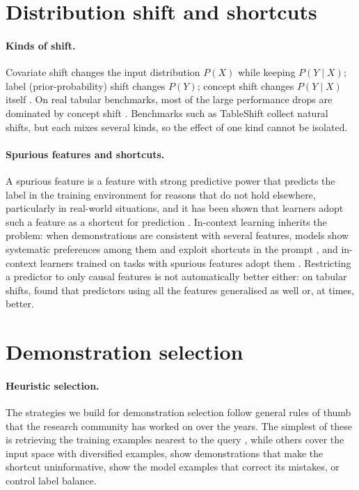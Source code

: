 \section{Distribution shift and shortcuts}
\label{sec:bg-shift}

\paragraph{Kinds of shift.}
Covariate shift changes the input distribution $P(X)$ while keeping $P(Y \mid X)$; label (prior-probability) shift changes $P(Y)$; concept shift changes $P(Y \mid X)$ itself \citep{shimodaira2000improving,quinonero2009dataset,morenotorres2012unifying}.
On real tabular benchmarks, most of the large performance drops are dominated by concept shift \citep{liu2023need}.
Benchmarks such as TableShift \citep{gardner2023tableshift} collect natural shifts, but each mixes several kinds, so the effect of one kind cannot be isolated.

\paragraph{Spurious features and shortcuts.}
A spurious feature is a feature with strong predictive power that predicts the label in the training environment for reasons that do not hold elsewhere, particularly in real-world situations, and it has been shown that learners adopt such a feature as a shortcut for prediction \citep{geirhos2020shortcut, nagarajan2021understanding}. In-context learning inherits the problem: when demonstrations are consistent with several features, models show systematic preferences among them \citep{si2023measuring} and exploit shortcuts in the prompt \citep{tang2023large}, and in-context learners trained on tasks with spurious features adopt them \citep{harutyunyan2026incontext,chen2026incontext}. Restricting a predictor to only causal features is not automatically better either: on tabular shifts, \citet{nastl2024causal} found that predictors using all the features generalised as well or, at times, better.

\section{Demonstration selection}
\label{sec:bg-selection}
\paragraph{Heuristic selection.}
The strategies we build for demonstration selection follow general rules of thumb that the research community has worked on over the years. The simplest of these is retrieving the training examples nearest to the query \citep{liu2022what}, while others cover the input space with diversified examples, show demonstrations that make the shortcut uninformative, show the model examples that correct its mistakes, or control label balance.

